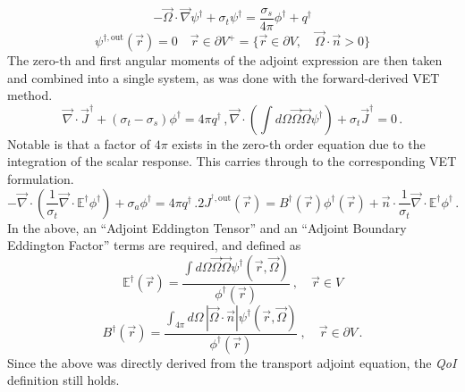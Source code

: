 \documentclass[12pt]{report}
\newcommand{\vr}{\vec{r}}
\newcommand{\vO}{\vec{\Omega}}
\renewcommand{\div}{\vec{\nabla} \cdot}
\newcommand{\grad}{\vec{\nabla}}
\newcommand{\bound}{\partial V}
\newcommand{\vn}{\vec{n}}
\newcommand{\Edd}{\mathbb{E}}
\newcommand{\BEdd}{B}
\newcommand{\sigt}{\sigma_t}
\newcommand{\sigs}{\sigma_s}
\newcommand{\siga}{\sigma_a}
\newcommand{\scalResp}{q^\dag}
\newcommand{\qoi}{{\it QoI}\xspace}
\begin{document}
\begin{equation}
\label{snAdjAlt}
- \vO \cdot \grad \psi^\dag + \sigt \psi^\dag = \frac{\sigs}{4 \pi} \phi^\dag + \scalResp
\end{equation}
%
\begin{equation}
\psi^{\dag, \text{out}}(\vr)=0 \quad \vr \in \partial V^{+} = \{  \vr \in \bound , \quad \vO \cdot \vec{n} > 0 \}
\end{equation}
The zero-th and first angular moments of the adjoint expression are then taken and combined into a single system, as was done with the forward-derived VET method.
\begin{subequations}
\begin{equation}
\label{0amAlt}
\div \vec{J}^\dag + (\sigt-\sigs) \phi^\dag  = 4\pi \scalResp \,,
\end{equation}
\begin{equation}
\label{1amAlt}
\div \left(  \int d\Omega \vO \vO \psi^\dag  \right) + \sigt \vec{J}^\dag  = 0 \,.
\end{equation}
\end{subequations}
%
Notable is that a factor of $4 \pi$ exists in the zero-th order equation due to the integration of the scalar response. This carries through to the corresponding VET formulation.
\begin{subequations}
\begin{equation}
\label{TranAdjVEFForm}
- \div \left( \frac{1}{\sigt}\div \Edd^\dag \phi^\dag  \right) + \siga \phi^\dag  = 4\pi \scalResp  \,.
\end{equation}
\begin{equation}
2 J^{^\dag,\text{out}}(\vr) = \BEdd^\dag(\vr) \phi^\dag(\vr)  + \vn \cdot \frac{1}{\sigt} \div \Edd^\dag  \phi^\dag  \,.
\end{equation}
\end{subequations}
In the above, an ``Adjoint Eddington Tensor'' and an ``Adjoint Boundary Eddington Factor'' terms are required, and defined as
\begin{equation}
\label{AdjEddDef}
\Edd^\dag(\vr)=\frac{\int d\Omega \vO \vO \psi^\dag(\vr,\vO)}{\phi^\dag(\vr)} \ , \quad \vr \in V
\end{equation} 
\begin{equation}
\BEdd^\dag(\vr) = \frac{\int_{4 \pi} d\Omega \, | \vO \cdot \vn | \psi^\dag (\vr,\vO)}{\phi^\dag(\vr)} \ ,\quad  \vr \in \bound \,.
\end{equation}
Since the above was directly derived from the transport adjoint equation, the \qoi definition still holds.
\end{document}
